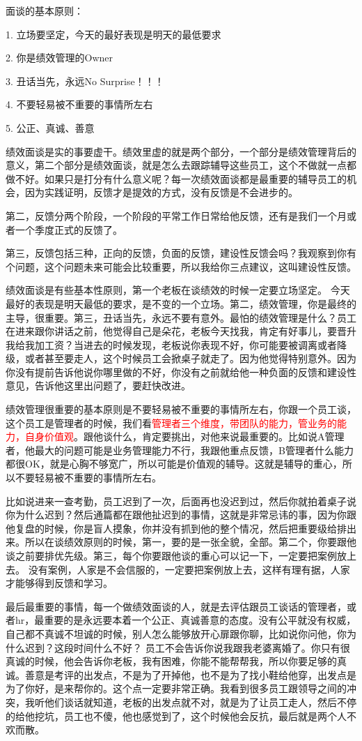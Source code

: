 \documentclass[12pt]{article}
\begin{document}
\begin{framed}
面谈的基本原则：

1. 立场要坚定，今天的最好表现是明天的最低要求

2. 你是绩效管理的Owner

3. 丑话当先，永远No Surprise！！！

4. 不要轻易被不重要的事情所左右

5. 公正、真诚、善意

绩效面谈是实的事要虚干。绩效里虚的就是两个部分，一个部分是绩效管理背后的意义，第二个部分是绩效面谈，就是怎么去跟踪辅导这些员工，这个不做就一点都做不好。如果只是打分有什么意义呢？每一次绩效面谈都是最重要的辅导员工的机会，因为实践证明，反馈才是提效的方式，没有反馈是不会进步的。

第二，反馈分两个阶段，一个阶段的平常工作日常给他反馈，还有是我们一个月或者一个季度正式的反馈了。

第三，反馈包括三种，正向的反馈，负面的反馈，建设性反馈会吗？我观察到你有个问题，这个问题未来可能会比较重要，所以我给你三点建议，这叫建设性反馈。

绩效面谈是有些基本性原则，第一个老板在谈绩效的时候一定要立场坚定。 今天最好的表现是明天最低的要求，是不变的一个立场。第二，绩效管理，你是最终的主导，很重要。第三，丑话当先，永远不要有意外。最怕的绩效管理是什么？员工在进来跟你讲话之前，他觉得自己是朵花，老板今天找我，肯定有好事儿，要晋升我给我加工资？当进去的时候发现，老板说你表现不好，你可能要被调离或者降级，或者甚至要走人，这个时候员工会掀桌子就走了。因为他觉得特别意外。因为你没有提前告诉他说你哪里做的不好，你没有之前就给他一种负面的反馈和建设性意见，告诉他这里出问题了，要赶快改进。

绩效管理很重要的基本原则是不要轻易被不重要的事情所左右，你跟一个员工谈，这个员工是管理者的时候，我们看\textcolor{red}{管理者三个维度，带团队的能力，管业务的能力，自身价值观}。跟他谈什么，肯定要挑出，对他来说最重要的。比如说A管理者，他最大的问题可能是业务管理能力不行，我跟他重点反馈，B管理者什么能力都很OK，就是心胸不够宽广，所以可能是价值观的辅导。这就是辅导的重心，所以不要轻易被不重要的事情所左右。

比如说进来一查考勤，员工迟到了一次，后面再也没迟到过，然后你就拍着桌子说你为什么迟到？然后通篇都在跟他扯迟到的事情，这就是非常忌讳的事，因为你跟他复盘的时候，你是盲人摸象，你并没有抓到他的整个情况，然后把重要级给排出来。所以在谈绩效原则的时候，第一，要的是一张全貌，全部。第二个，你要跟他谈之前要排优先级。第三，每个你要跟他谈的重心可以记一下，一定要把案例放上去。 没有案例，人家是不会信服的，一定要把案例放上去，这样有理有据，人家才能够得到反馈和学习。

最后最重要的事情，每一个做绩效面谈的人，就是去评估跟员工谈话的管理者，或者hr，最重要的是永远要本着一个公正、真诚善意的态度。没有公平就没有权威，自己都不真诚不坦诚的时候，别人怎么能够放开心扉跟你聊，比如说你问他，你为什么迟到？这段时间什么不好？ 员工不会告诉你说我跟我老婆离婚了。你只有很真诚的时候，他会告诉你老板，我有困难，你能不能帮帮我，所以你要足够的真诚。善意是考评的出发点，不是为了开掉他，也不是为了找小鞋给他穿，出发点是为了你好，是来帮你的。这个点一定要非常正确。我看到很多员工跟领导之间的冲突，我听他们谈话就知道，老板的出发点就不对，就是为了让员工走人，然后不停的给他挖坑，员工也不傻，他也感觉到了，这个时候他会反抗，最后就是两个人不欢而散。
\end{framed}
\end{document}
